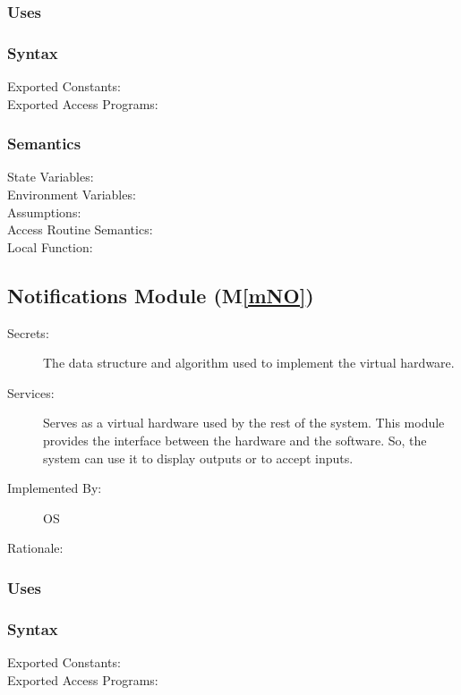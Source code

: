 \documentclass[12pt, titlepage]{article}
\newcommand{\mref}[1]{M\ref{#1}}
\begin{document}
\begin{description}
\begin{description}
\subsubsection{Uses}

\subsubsection{Syntax}
\begin{description}
  \item[Exported Constants:] 
  \item[Exported Access Programs:] 
\end{description}

\subsubsection{Semantics}
\begin{description}
  \item[State Variables:]
  \item[Environment Variables:]  
  \item[Assumptions:] 
  \item[Access Routine Semantics:] 
  \item[Local Function:] 
\end{description}

\subsection{Notifications Module (\mref{mNO})}
\begin{description}
  \item[Secrets:]The data structure and algorithm used to implement the virtual
    hardware.
  \item[Services:]Serves as a virtual hardware used by the rest of the
    system. This module provides the interface between the hardware and the
    software. So, the system can use it to display outputs or to accept inputs.
  \item[Implemented By:] OS
  \item[Rationale:] 
\end{description}

\subsubsection{Uses}

\subsubsection{Syntax}
\begin{description}
  \item[Exported Constants:] 
  \item[Exported Access Programs:] 
\end{description}


\end{description}
\end{description}
\end{document}
